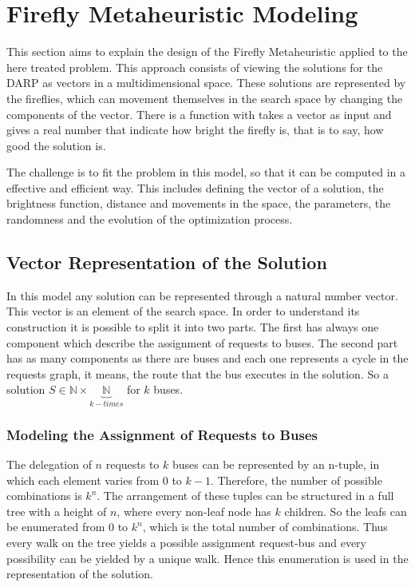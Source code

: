 \documentclass[tuberlin,cic,tc,openright,english,noabntcite,oneside]{iiufrgs}
\begin{document}
\section{Firefly Metaheuristic Modeling}
This section aims to explain the design of the Firefly Metaheuristic applied to the here treated problem. This approach consists of viewing the solutions for the DARP as vectors in a multidimensional space. These solutions are represented by the fireflies, which can movement themselves in the search space by changing the components of the vector. There is a function with takes a vector as input and gives a real number that indicate how bright the firefly is, that is to say, how good the solution is.

The challenge is to fit the problem in this model, so that it can be computed in a effective and efficient way. This includes defining the vector of a solution, the brightness function, distance and movements in the space, the parameters, the randomness and the evolution of the optimization process.

\subsection{Vector Representation of the Solution}
In this model any solution can be represented through a natural number vector. This vector is an element of the search space. In order to understand its construction it is possible to split it into two parts. The first has always one component which describe the assignment of requests to buses. The second part has as many components as there are buses and each one represents a cycle in the requests graph, it means, the route that the bus executes in the solution. So a solution $S \in \mathbb{N} \times \underbrace{\mathbb{N}}_{k-times}$ for $k$ buses.

\subsubsection{Modeling the Assignment of Requests to Buses}
The delegation of $n$ requests to $k$ buses can be represented by an n-tuple, in which each element varies from $0$ to $k-1$. Therefore, the number of possible combinations is $k^{n}$. The arrangement of these tuples can be structured in a full tree with a height of $n$, where every non-leaf node has $k$ children. So the leafs can be enumerated from $0$ to $k^{n}$, which is the total number of combinations. Thus every walk on the tree yields a possible assignment request-bus and every possibility can be yielded by a unique walk. Hence this enumeration is used in the representation of the solution.
\end{document}
